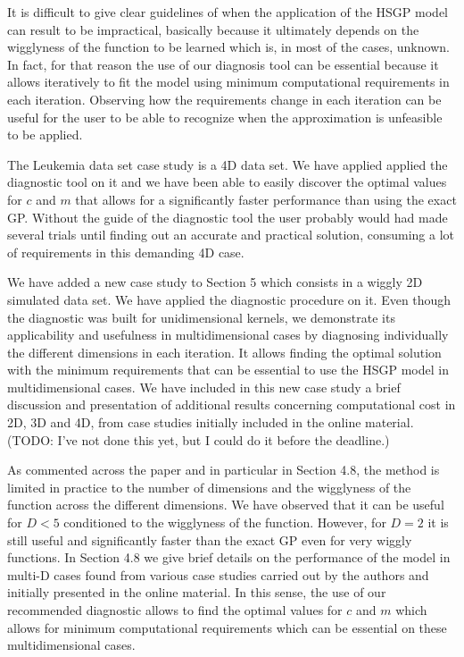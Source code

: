 \documentclass[11pt]{report}
\begin{document}
It is difficult to give clear guidelines of when the application of the HSGP model can result to be impractical, basically because it ultimately depends on the wigglyness of the function to be learned which is, in most of the cases, unknown. In fact, for that reason the use of our diagnosis tool can be essential because it allows iteratively to fit the model using minimum computational requirements in each iteration. Observing how the requirements change in each iteration can be useful for the user to be able to recognize when the approximation is unfeasible to be applied.

The Leukemia data set case study is a 4D data set. We have applied applied the diagnostic tool on it and we have been able to easily discover the optimal values for $c$ and $m$ that allows for a significantly faster performance than using the exact GP. Without the guide of the diagnostic tool the user probably would had made several trials until finding out an accurate and practical solution, consuming a lot of requirements in this demanding 4D case.

We have added a new case study to Section 5 which consists in a wiggly 2D simulated data set. We have applied the diagnostic procedure on it. Even though the diagnostic was built for unidimensional kernels, we demonstrate its applicability and usefulness in multidimensional cases by diagnosing individually the different dimensions in each iteration. It allows finding the  optimal solution with the minimum requirements that can be essential to use the HSGP model in multidimensional cases. We have included in this new case study a brief discussion and presentation of additional results concerning computational cost in 2D, 3D and 4D, from case studies initially included in the online material. {\color{red} (TODO: I've not done this yet, but I could do it before the deadline.)}

As commented across the paper and in particular in Section 4.8, the method is limited in practice to the number of dimensions and the wigglyness of the function across the different dimensions. We have observed that it can be useful for $D<5$ conditioned to the wigglyness of the function. However, for $D=2$ it is still useful and significantly faster than the exact GP even for very wiggly functions. In Section 4.8 we give brief details on the performance of the model in multi-D cases found from various case studies carried out by the authors and initially presented in the online material. In this sense, the use of our recommended diagnostic allows to find the optimal values for $c$ and $m$ which allows for minimum computational requirements which can be essential on these multidimensional cases.
\end{document}
